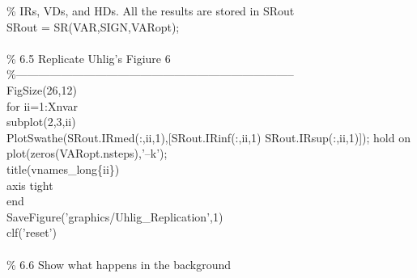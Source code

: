 \hspace{1mm}\textcolor{matlabgreen}{\% IRs, VDs, and HDs. All the results are stored in SRout }\\ 
\hspace{1mm}SRout = SR(VAR,SIGN,VARopt); \\ 
\hspace{1mm} \\ 
\hspace{1mm}\textcolor{matlabgreen}{\% 6.5 Replicate Uhlig's Figiure 6 }\\ 
\hspace{1mm}\textcolor{matlabgreen}{\%--------------------------------------------------------------------------  }\\ 
\hspace{1mm}FigSize(26,12) \\ 
\hspace{1mm}\textcolor{matlabblue}{for} ii=1:Xnvar \\ 
\hspace{1mm}\hspace{5mm} subplot(2,3,ii) \\ 
\hspace{1mm}\hspace{5mm} PlotSwathe(SRout.IRmed(:,ii,1),[SRout.IRinf(:,ii,1) SRout.IRsup(:,ii,1)]); hold on \\ 
\hspace{1mm}\hspace{5mm} plot(zeros(VARopt.nsteps),\textcolor{matlabpurple}{'--k'}); \\ 
\hspace{1mm}\hspace{5mm} title(vnames\_long\{ii\}) \\ 
\hspace{1mm}\hspace{5mm} axis tight \\ 
\hspace{1mm}\textcolor{matlabblue}{end} \\ 
\hspace{1mm}SaveFigure(\textcolor{matlabpurple}{'graphics/Uhlig\_Replication'},1) \\ 
\hspace{1mm}clf(\textcolor{matlabpurple}{'reset'}) \\ 
\hspace{1mm} \\ 
\hspace{1mm}\textcolor{matlabgreen}{\% 6.6 Show what happens in the background }\\ 

